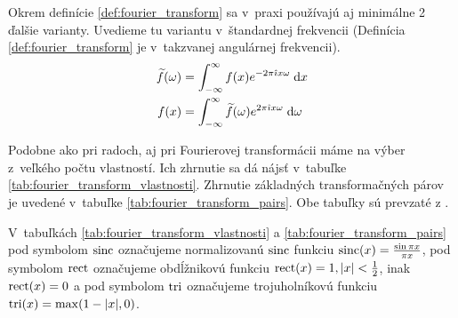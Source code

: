 Okrem definície \ref{def:fourier_transform} sa v~praxi používajú aj
minimálne 2 ďalšie varianty. Uvedieme tu variantu v~štandardnej
frekvencii (Definícia \ref{def:fourier_transform} je v~takzvanej
angulárnej frekvencii).
\begin{align*}
    \widetilde{f}(\omega) &= \int_{-\infty}^{\infty} f(x) e^{-2\pi\hat{\imath} x \omega} \; \mathrm{d} x\\
    f(x) &= \int_{-\infty}^{\infty} \widetilde{f}(\omega) e^{2\pi\hat{\imath} x \omega} \; \mathrm{d}
    \omega
\end{align*}

Podobne ako pri radoch, aj pri Fourierovej transformácii máme na výber
z~veľkého počtu vlastností. Ich zhrnutie sa dá nájsť v~tabuľke
\ref{tab:fourier_transform_vlastnosti}. Zhrnutie základných
transformačných párov je uvedené v~tabuľke
\ref{tab:fourier_transform_pairs}. Obe tabuľky sú prevzaté z
\cite{wiki:fourier_transform}.
\begin{poznamka}
    V~tabuľkách \ref{tab:fourier_transform_vlastnosti} a 
    \ref{tab:fourier_transform_pairs} pod symbolom $\operatorname{sinc}$ označujeme
    normalizovanú $\operatorname{sinc}$ funkciu $\operatorname{sinc}(x) = \frac{\sin \pi x}{\pi x}$,
    pod symbolom ${\rm rect}$ označujeme obdĺžnikovú funkciu
    ${\rm rect}(x) = 1, |x|<\frac{1}{2}$, inak ${\rm rect}(x)=0$
    a pod symbolom ${\rm tri}$ označujeme trojuholníkovú funkciu \
    ${\rm tri}(x)=\max(1-|x|,0)$.
\end{poznamka}

